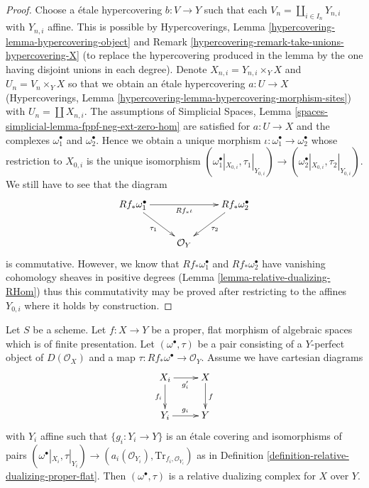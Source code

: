 \begin{proof}
\medskip\noindent
Choose a \'etale hypercovering $b : V \to Y$ such that each
$V_n = \coprod_{i \in I_n} Y_{n, i}$ with $Y_{n, i}$ affine.
This is possible by Hypercoverings, Lemma
\ref{hypercovering-lemma-hypercovering-object} and
Remark \ref{hypercovering-remark-take-unions-hypercovering-X}
(to replace the hypercovering produced
in the lemma by the one having disjoint unions in each degree).
Denote $X_{n, i} = Y_{n, i} \times_Y X$ and $U_n = V_n \times_Y X$
so that we obtain an \'etale hypercovering
$a : U \to X$ (Hypercoverings, Lemma
\ref{hypercovering-lemma-hypercovering-morphism-sites})
with $U_n = \coprod X_{n, i}$.
The assumptions of Simplicial Spaces, Lemma
\ref{spaces-simplicial-lemma-fppf-neg-ext-zero-hom}
are satisfied for $a : U \to X$ and the complexes
$\omega_1^\bullet$ and $\omega_2^\bullet$.
Hence we obtain a unique morphism
$\iota : \omega_1^\bullet \to \omega_2^\bullet$
whose restriction to $X_{0, i}$ is the unique
isomorphism $(\omega_1^\bullet|_{X_{0, i}}, \tau_1|_{Y_{0, i}}) \to
(\omega_2^\bullet|_{X_{0, i}}, \tau_2|_{Y_{0, i}})$.
We still have to see that the diagram
$$
\xymatrix{
Rf_*\omega_1^\bullet \ar[rd]_{\tau_1} \ar[rr]_{Rf_*\iota} & &
Rf_*\omega_2^\bullet \ar[ld]^{\tau_2} \\
& \mathcal{O}_Y
}
$$
is commutative. However, we know that $Rf_*\omega_1^\bullet$ and
$Rf_*\omega_2^\bullet$ have vanishing cohomology sheaves in positive
degrees (Lemma \ref{lemma-relative-dualizing-RHom})
thus this commutativity may be proved after
restricting to the affines $Y_{0, i}$ where it holds by construction.
\end{proof}

\begin{lemma}
\label{lemma-covering-enough}
Let $S$ be a scheme. Let $f : X \to Y$ be a proper, flat morphism of
algebraic spaces which is of finite presentation.
Let $(\omega^\bullet, \tau)$ be a pair consisting
of a $Y$-perfect object of $D(\mathcal{O}_X)$ and a map
$\tau : Rf_*\omega^\bullet \to \mathcal{O}_Y$.
Assume we have cartesian diagrams
$$
\xymatrix{
X_i \ar[r]_{g_i'} \ar[d]_{f_i} & X \ar[d]^f \\
Y_i \ar[r]^{g_i} & Y
}
$$
with $Y_i$ affine such that $\{g_i : Y_i \to Y\}$ is an \'etale covering
and isomorphisms of pairs $(\omega^\bullet|_{X_i}, \tau|_{Y_i})
\to (a_i(\mathcal{O}_{Y_i}), \text{Tr}_{f_i, \mathcal{O}_{Y_i}})$
as in Definition \ref{definition-relative-dualizing-proper-flat}.
Then $(\omega^\bullet, \tau)$ is a relative dualizing complex for $X$ over $Y$.
\end{lemma}

